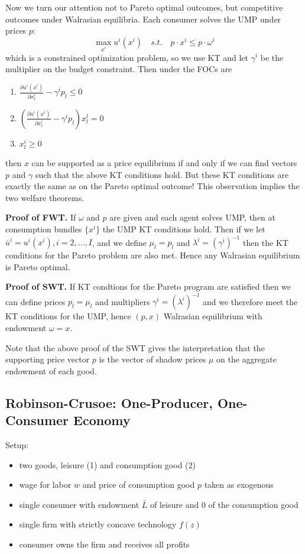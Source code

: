 Now we turn our attention not to Pareto optimal outcomes, but
competitive outcomes under Walrasian equilibria. Each consumer solves
the UMP under prices $p$:
\[
\max_{x^i} u^i(x^i) \quad s.t. \quad p \cdot x^i \leq p \cdot \omega^i
\]
which is a constrained optimization problem, so we use KT and let
$\gamma^i$ be the multiplier on the budget constraint. Then under
the FOCs are
\begin{enumerate}
\item $\frac{\partial u^i(x^i)}{\partial x^i_l} - \gamma^ip_l \leq 0$
\item $\left(\frac{\partial u^i(x^i)}{\partial x^i_l} -
    \gamma^ip_l\right)x^l_l = 0$
\item $x^i_l \geq 0$
\end{enumerate}
then $x$ can be supported as a price equilibrium if and only if we can
find vectors $p$ and $\gamma$ such that the above KT conditions
hold. But these KT conditions are exactly the same as on the Pareto
optimal outcome! This observation implies the two
welfare theorems.

\textbf{Proof of FWT.} If $\omega$ and $p$ are given and each agent
solves UMP, then at consumption bundles $\{x^i\}$ the UMP KT
conditions hold. Then if we let $\bar u^i = u^i(x^i), i = 2, \dots,
I$, and we define $\mu_l = p_l$ and $\lambda^i = (\gamma^i)^{-1}$ then
the KT conditions for the Pareto problem are also met. Hence any
Walrasian equilibrium is Pareto optimal.

\textbf{Proof of SWT.} If KT condtions for the Pareto program are
satisfied then we can define prices $p_l = \mu_l$ and multipliers
$\gamma^i = (\lambda^i)^{-1}$ and we therefore meet the KT conditions
for the UMP, hence $(p, x)$ Walrasian equilibrium with endowment
$\omega = x$.

Note that the above proof of the SWT gives the interpretation that the
supporting price vector $p$ is the vector of shadow prices $\mu$ on
the aggregate endowment of each good.




\subsection{Robinson-Crusoe: One-Producer, One-Consumer Economy}
\label{sec:robinson-crusoe}

Setup:
\begin{itemize}
\item two goods, leisure (1) and consumption good (2)
\item wage for labor $w$ and price of consumption good $p$ taken as
  exogenous
\item single consumer with endowment $\bar L$ of leisure and $0$ of
  the consumption good
\item single firm with strictly concave technology $f(z)$
\item consumer owns the firm and receives all profits
\end{itemize}


